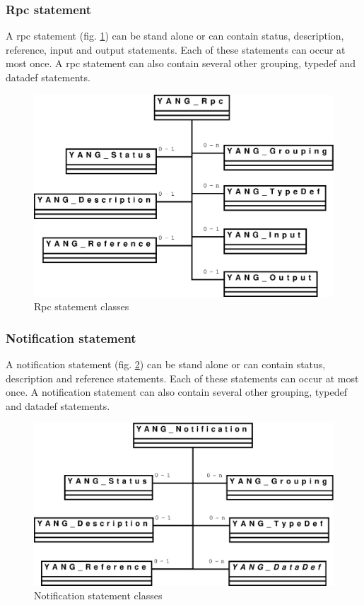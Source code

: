 \documentclass[a4paper]{article}
\begin{document}
\subsubsection{Rpc statement}

A rpc  statement (fig.  \ref{rpc}) can be  stand alone or  can contain
status, description, reference, input  and output statements.  Each of
these statements  can occur  at most once.   A rpc statement  can also
contain several other grouping, typedef and datadef statements.
\begin{figure}[htbp]
\begin{center}
\includegraphics[scale = .3]{rpc.eps}
\end{center}
\caption{Rpc statement classes}
\label{rpc}
\end{figure}

\subsubsection{Notification statement}

A notification statement (fig.  \ref{notification}) can be stand alone
or can contain status,  description and reference statements.  Each of
these statements can occur at  most once. A notification statement can
also contain several other grouping, typedef and datadef statements.
\begin{figure}[htbp]
\begin{center}
\includegraphics[scale = .3]{notification.eps}
\end{center}
\caption{Notification statement classes}
\label{notification}
\end{figure}
\end{document}
